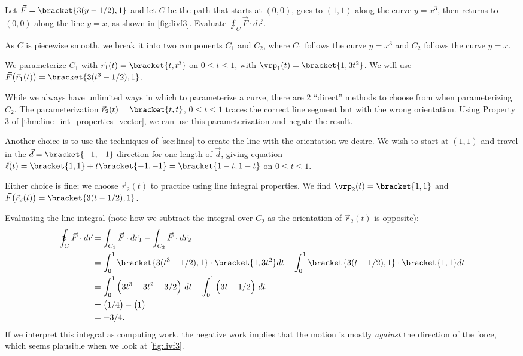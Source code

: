 {Let $\vec F =\bracket{3(y-1/2),1}$ and let $C$ be the path that starts at $(0,0)$, goes to $(1,1)$ along the curve $y=x^3$, then returns to $(0,0)$ along the line $y=x$, as shown in \autoref{fig:livf3}. Evaluate $\oint_C \vec F\cdot d\vec r$.}
{As $C$ is piecewise smooth, we break it into two components $C_1$ and $C_2$, where $C_1$ follows the curve $y=x^3$ and $C_2$ follows the curve $y=x$. 

We parameterize $C_1$ with $\vec r_1(t) =\bracket{t, t^3}$ on $0\leq t\leq 1$, with $\vrp_1(t) =\bracket{1,3t^2}$. We will use $\vec F\big(\vec r_1(t)\big) =\bracket{3(t^3-1/2),1}$.

While we always have unlimited ways in which to parameterize a curve, there are 2 ``direct'' methods to choose from when parameterizing $C_2$. The parameterization $\vec r_2(t)=\bracket{t,t}$, $0\leq t\leq 1$ traces the correct line segment but with the wrong orientation. Using Property 3 of \autoref{thm:line_int_properties_vector}, we can use this parameterization and negate the result.

Another choice is to use the techniques of \autoref{sec:lines} to create the line with the orientation we desire. We wish to start at $( 1,1)$ and travel in the $\vec d =\bracket{-1,-1}$ direction for one length of $\vec d$, giving equation $\vec \ell(t) =\bracket{1,1} + t\bracket{-1,-1} =\bracket{1-t,1-t}$ on $0\leq t\leq 1$.

Either choice is fine; we choose $\vec r_2(t)$ to practice using line integral properties. We find $\vrp_2(t) =\bracket{1,1}$ and $\vec F\big(\vec r_2(t)\big) =\bracket{3(t-1/2),1}$.

Evaluating the line integral (note how we subtract the integral over $C_2$ as the orientation of $\vec r_2(t)$ is opposite):
\begin{align*}
	\oint_C \vec F\cdot d\vec r
	&= \int_{C_1}\vec F\cdot d\vec r_1 - \int_{C_2}\vec F\cdot d\vec r_2 \\
	&= \int_0^1\bracket{3(t^3-1/2),1}\cdot\bracket{1,3t^2} dt
	- \int_0^1\bracket{3(t-1/2),1}\cdot\bracket{1,1}dt \\
	&= \int_0^1\Big(3t^3+3t^2-3/2\Big)\ dt - \int_0^1 \Big(3t-1/2\Big)\ dt\\
	&= \big(1/4 \big) - \big(1\big)\\
	&=	-3/4.
\end{align*}
If we interpret this integral as computing work, the negative work implies that the motion is mostly \emph{against} the direction of the force, which seems plausible when we look at \autoref{fig:livf3}.}

